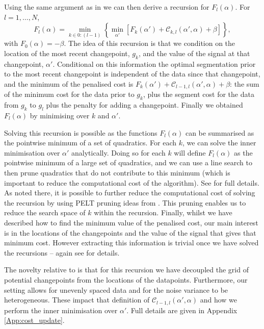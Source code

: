 \documentclass[nojss]{jss}
\begin{document}
Using the same argument as in \cite{fearnhead2019detecting} we can then derive a recursion for $F_l(\alpha)$. For $l=1,\ldots,N$,
\[
F_l(\alpha)= \min_{k \in 0:(l-1)} \left\{
\min_{\alpha'} \left[
F_{k}(\alpha')+\mathcal{C}_{k,l}(\alpha',\alpha) +\beta
\right]
\right\},
\]
with $F_0(\alpha)= -\beta$. The idea of this recursion is that we condition on the location of the most recent changepoint, $g_k$, and the value of the signal at that changepoint, $\alpha'$. Conditional on this information the optimal segmentation prior to the most recent changepoint is independent of the data since that changepoint, and the minimum of the penalised cost is $F_{k}(\alpha')+\mathcal{C}_{l-1,l}(\alpha',\alpha) +\beta$: the sum of the minimum cost for the data prior to $g_k$, plus the segment cost for the data from $g_k$ to $g_l$ plus the penalty for adding a changepoint. Finally we obtained $F_l(\alpha)$ by minimising over $k$ and $\alpha'$.

Solving this recursion is possible as the functions $F_l(\alpha)$ can be summarised as the pointwise minimum of a set of quadratics. For each $k$, we can solve the inner minimisation over $\alpha'$ analytically. Doing so for each $k$ will define $F_l(\alpha)$ as the pointwise minimum of a large set of quadratics, and we can use a line search to then prune quadratics that do not contribute to this minimum (which is important to reduce the computational cost of the algorithm). See \cite{fearnhead2019detecting} for full details. As noted there, it is possible to further reduce the computational cost of solving the recursion by using PELT pruning ideas from \cite{killick2012optimal}. This pruning enables us to reduce the search space of $k$ within the recursion. Finally, whilst we have described how to find the minimum value of the penalised cost, our main interest is in the locations of the changepoints and the value of the signal that gives that minimum cost. However extracting this information is trivial once we have solved the recursions -- again see \cite{fearnhead2019detecting} for details.

The novelty relative to \cite{fearnhead2019detecting} is that for this recursion we have decoupled the grid of potential changepoints from the locations of the datapoints. Furthermore, our setting allows for unevenly spaced data and for the noise variance to be heterogeneous. These impact that definition of $\mathcal{C}_{l-1,l}(\alpha',\alpha)$ and how we perform the inner minimisation over $\alpha'$. Full details are given in Appendix \ref{App:cost_update}.
\end{document}
